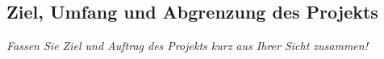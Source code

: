 \subsection{Ziel, Umfang und Abgrenzung des Projekts}

\textit{Fassen Sie Ziel und Auftrag des Projekts kurz aus Ihrer Sicht zusammen!}

